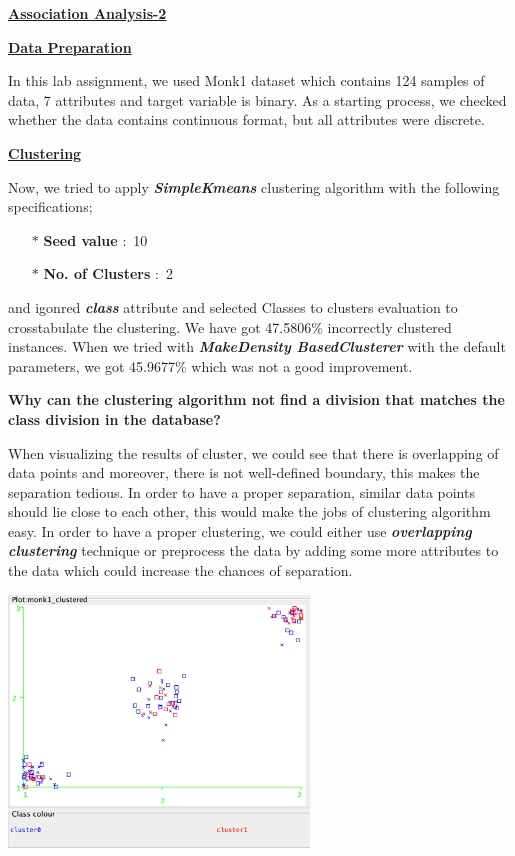 \documentclass[a4paper,10pt]{article}
\begin{document}
\begin{center}
	\large\textbf{\underline{Association Analysis-2}} \par
\end{center} \par
\textbf{\underline{Data Preparation}} \par
In this lab assignment, we used Monk1 dataset which contains 124 samples of data, 7 attributes and target 
variable is binary. As a starting process, we checked whether the data contains continuous format, but all
attributes were discrete.  \par
\textbf{\underline{Clustering}} \par
Now, we tried to apply \textbf{\textit{SimpleKmeans}} clustering algorithm with the following specifications;
\begin{enumerate}
  \item[$*$] \textbf{Seed value} $:$ 10
  \item[$*$] \textbf{No. of Clusters} $:$ 2 
\end{enumerate}
and igonred \textbf{\textit{class}} attribute and selected Classes to clusters evaluation to crosstabulate the 
clustering. We have got 47.5806\% incorrectly clustered instances. When we tried with \textbf{\textit{MakeDensity
BasedClusterer}} with the default parameters, we got 45.9677\% which was not a good improvement.
\par
\textbf{Why can the clustering algorithm not find a division that matches the class division in the database?} \par
When visualizing the results of cluster, we could see that there is overlapping of data points and moreover,
there is not well-defined boundary, this makes the separation tedious. In order to have a proper separation,
similar data points should lie close to each other, this would make the jobs of clustering algorithm easy.
In order to have a proper clustering, we could either use \textbf{\textit{overlapping clustering}} technique
or preprocess the data by adding some more attributes to the data which could increase the chances of separation.
\begin{center}
  \includegraphics[width=80mm,scale=0.10]{Clustering_Visualization.png}
\end{center}
\end{document}
